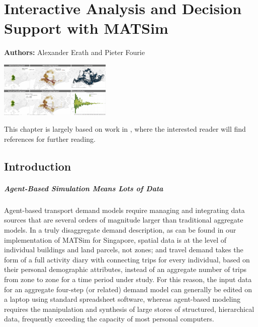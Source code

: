 \chapter{Interactive Analysis and Decision Support with MATSim}
\label{ch:businessanalytics}

\hfill \textbf{Authors:} Alexander Erath and Pieter Fourie

\begin{center} \includegraphics[width=0.4\textwidth, angle=0]{extending/figures/businessanalytics/tableau.png} \end{center}


This chapter is largely based on work in \citet[][]{ErathEtAl_EASTS_2013}, where the interested reader will find references for further reading.
\section{Introduction}
\label{sec:analyticsIntro}
\paragraph{Agent-Based Simulation Means Lots of Data}
Agent-based transport demand models require managing and integrating data sources that are several orders of magnitude larger than traditional aggregate models. In a truly disaggregate demand description, as can be found in our implementation of MATSim for Singapore, spatial data is at the level of individual buildings and land parcels, not zones; and travel demand takes the form of a full activity diary with connecting trips for every individual, based on their personal demographic attributes, instead of an aggregate number of trips from zone to zone for a time period under study. For this reason, the input data for an aggregate four-step (or related) demand model can generally be edited on a laptop using standard spreadsheet software, whereas agent-based modeling requires the manipulation and synthesis of large stores of structured, hierarchical data, frequently exceeding the capacity of most personal computers.

